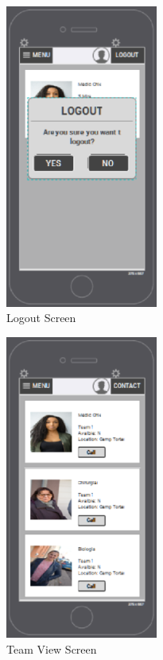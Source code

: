 \begin{figure}[htbp]
\begin{center}
 \caption{\label{fig:A12} Logout Screen}
   \includegraphics[width=50mm]{./images/App/logoutscreen.eps}
\end{center}
\end{figure}
\begin{figure}[htbp]
\begin{center}
 \caption{\label{fig:A18} Team View Screen}
   \includegraphics[width=50mm]{./images/App/teamview.eps}
\end{center}
\end{figure}
